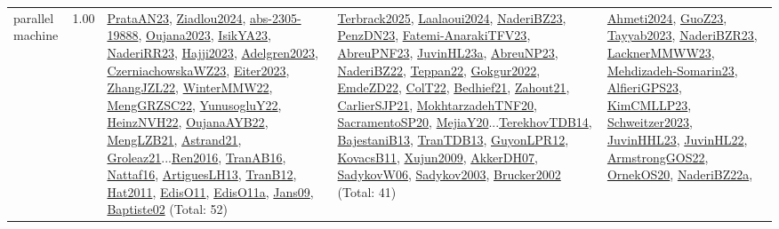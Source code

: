 {\begin{longtable}{p{3cm}r>{\raggedright\arraybackslash}p{6cm}>{\raggedright\arraybackslash}p{6cm}>{\raggedright\arraybackslash}p{8cm}}
\index{parallel machine}\index{Classification!parallel machine}parallel machine &  1.00 & \hyperref[detail:PrataAN23]{PrataAN23}, \hyperref[detail:Ziadlou2024]{Ziadlou2024}, \hyperref[detail:abs-2305-19888]{abs-2305-19888}, \hyperref[detail:Oujana2023]{Oujana2023}, \hyperref[detail:IsikYA23]{IsikYA23}, \hyperref[detail:NaderiRR23]{NaderiRR23}, \hyperref[detail:Hajji2023]{Hajji2023}, \hyperref[detail:Adelgren2023]{Adelgren2023}, \hyperref[detail:CzerniachowskaWZ23]{CzerniachowskaWZ23}, \hyperref[detail:Eiter2023]{Eiter2023}, \hyperref[detail:ZhangJZL22]{ZhangJZL22}, \hyperref[detail:WinterMMW22]{WinterMMW22}, \hyperref[detail:MengGRZSC22]{MengGRZSC22}, \hyperref[detail:YunusogluY22]{YunusogluY22}, \hyperref[detail:HeinzNVH22]{HeinzNVH22}, \hyperref[detail:OujanaAYB22]{OujanaAYB22}, \hyperref[detail:MengLZB21]{MengLZB21}, \hyperref[detail:Astrand21]{Astrand21}, \hyperref[detail:Groleaz21]{Groleaz21}...\hyperref[detail:Ren2016]{Ren2016}, \hyperref[detail:TranAB16]{TranAB16}, \hyperref[detail:Nattaf16]{Nattaf16}, \hyperref[detail:ArtiguesLH13]{ArtiguesLH13}, \hyperref[detail:TranB12]{TranB12}, \hyperref[detail:Hat2011]{Hat2011}, \hyperref[detail:EdisO11]{EdisO11}, \hyperref[detail:EdisO11a]{EdisO11a}, \hyperref[detail:Jans09]{Jans09}, \hyperref[detail:Baptiste02]{Baptiste02} (Total: 52) & \hyperref[detail:Terbrack2025]{Terbrack2025}, \hyperref[detail:Laalaoui2024]{Laalaoui2024}, \hyperref[detail:NaderiBZ23]{NaderiBZ23}, \hyperref[detail:PenzDN23]{PenzDN23}, \hyperref[detail:Fatemi-AnarakiTFV23]{Fatemi-AnarakiTFV23}, \hyperref[detail:AbreuPNF23]{AbreuPNF23}, \hyperref[detail:JuvinHL23a]{JuvinHL23a}, \hyperref[detail:AbreuNP23]{AbreuNP23}, \hyperref[detail:NaderiBZ22]{NaderiBZ22}, \hyperref[detail:Teppan22]{Teppan22}, \hyperref[detail:Gokgur2022]{Gokgur2022}, \hyperref[detail:EmdeZD22]{EmdeZD22}, \hyperref[detail:ColT22]{ColT22}, \hyperref[detail:Bedhief21]{Bedhief21}, \hyperref[detail:Zahout21]{Zahout21}, \hyperref[detail:CarlierSJP21]{CarlierSJP21}, \hyperref[detail:MokhtarzadehTNF20]{MokhtarzadehTNF20}, \hyperref[detail:SacramentoSP20]{SacramentoSP20}, \hyperref[detail:MejiaY20]{MejiaY20}...\hyperref[detail:TerekhovTDB14]{TerekhovTDB14}, \hyperref[detail:BajestaniB13]{BajestaniB13}, \hyperref[detail:TranTDB13]{TranTDB13}, \hyperref[detail:GuyonLPR12]{GuyonLPR12}, \hyperref[detail:KovacsB11]{KovacsB11}, \hyperref[detail:Xujun2009]{Xujun2009}, \hyperref[detail:AkkerDH07]{AkkerDH07}, \hyperref[detail:SadykovW06]{SadykovW06}, \hyperref[detail:Sadykov2003]{Sadykov2003}, \hyperref[detail:Brucker2002]{Brucker2002} (Total: 41) & \hyperref[detail:Ahmeti2024]{Ahmeti2024}, \hyperref[detail:GuoZ23]{GuoZ23}, \hyperref[detail:Tayyab2023]{Tayyab2023}, \hyperref[detail:NaderiBZR23]{NaderiBZR23}, \hyperref[detail:LacknerMMWW23]{LacknerMMWW23}, \hyperref[detail:Mehdizadeh-Somarin23]{Mehdizadeh-Somarin23}, \hyperref[detail:AlfieriGPS23]{AlfieriGPS23}, \hyperref[detail:KimCMLLP23]{KimCMLLP23}, \hyperref[detail:Schweitzer2023]{Schweitzer2023}, \hyperref[detail:JuvinHHL23]{JuvinHHL23}, \hyperref[detail:JuvinHL22]{JuvinHL22}, \hyperref[detail:ArmstrongGOS22]{ArmstrongGOS22}, \hyperref[detail:OrnekOS20]{OrnekOS20}, \hyperref[detail:NaderiBZ22a]{NaderiBZ22a}, 
\end{longtable}}
